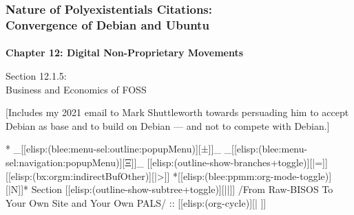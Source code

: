 \begin{whenOrg}
\begin{verblatex}

\begin{frame}[fragile,plain,label=citation_debuntu]
    \frametitle{Nature of Polyexistentials Citations:\\ Convergence of Debian and Ubuntu}
    \framesubtitle{}

    \begin{center}
      \begin{large}
        \textbf{Chapter 12: Digital Non-Proprietary Movements}
      \end{large}
  \end{center}

    \bigskip

  \begin{large}
Section 12.1.5:\\[10pt] Business and Economics of FOSS
  \end{large}

    \bigskip

[Includes my 2021 email to Mark Shuttleworth towards persuading him to accept Debian as base and to build on Debian --- and not to compete with Debian.]


\end{frame}
\end{verblatex}



\begin{whenOrg}
*  _[[elisp:(blee:menu-sel:outline:popupMenu)][±]]_ _[[elisp:(blee:menu-sel:navigation:popupMenu)][Ξ]]_ [[elisp:(outline-show-branches+toggle)][|=]] [[elisp:(bx:orgm:indirectBufOther)][|>]] *[[elisp:(blee:ppmm:org-mode-toggle)][|N]]*  Section    [[elisp:(outline-show-subtree+toggle)][||]]   /From Raw-BISOS To Your Own Site and Your Own PALS/ ::  [[elisp:(org-cycle)][| ]]
\end{whenOrg}


\end{whenOrg}
